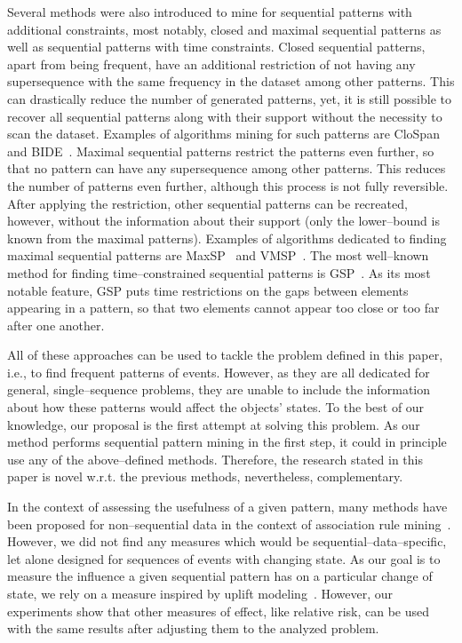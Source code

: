 \documentclass[runningheads,a4paper]{llncs}
\begin{document}
Several methods were also introduced to mine for sequential patterns with additional constraints, most notably, closed and maximal sequential patterns as well as sequential patterns with time constraints.
Closed sequential patterns, apart from being frequent, have an additional restriction of not having any supersequence with the same frequency in the dataset among other patterns.
This can drastically reduce the number of generated patterns, yet, it is still possible to recover all sequential patterns along with their support without the necessity to scan the dataset.
Examples of algorithms mining for such patterns are CloSpan~\cite{Yan:2003} and BIDE~\cite{Wang:2004}.
Maximal sequential patterns restrict the patterns even further, so that no pattern can have any supersequence among other patterns.
This reduces the number of patterns even further, although this process is not fully reversible.
After applying the restriction, other sequential patterns can be recreated, however, without the information about their support (only the lower--bound is known from the maximal patterns).
Examples of algorithms dedicated to finding maximal sequential patterns are MaxSP~\cite{Fournier:2013} and VMSP~\cite{Fournier:2014-2}.
The most well--known method for finding time--constrained sequential patterns is GSP~\cite{Srikant:1996}.
As its most notable feature, GSP puts time restrictions on the gaps between elements appearing in a pattern, so that two elements cannot appear too close or too far after one another.

All of these approaches can be used to tackle the problem defined in this paper, i.e., to find frequent patterns of events.
However, as they are all dedicated for general, single--sequence problems, they are unable to include the information about how these patterns would affect the objects' states.
To the best of our knowledge, our proposal is the first attempt at solving this problem.
As our method performs sequential pattern mining in the first step, it could in principle use any of the above--defined methods.
Therefore, the research stated in this paper is novel w.r.t. the previous methods, nevertheless, complementary.

In the context of assessing the usefulness of a given pattern, many methods have been proposed for non--sequential data in the context of association rule mining~\cite{Lenca:2007,Tan:2002}.
However, we did not find any measures which would be sequential--data--specific, let alone designed for sequences of events with changing state.
As our goal is to measure the influence a given sequential pattern has on a particular change of state, we rely on a measure inspired by uplift modeling~\cite{Radcliffe:1999}.
However, our experiments show that other measures of effect, like relative risk, can be used with the same results after adjusting them to the analyzed problem.
\end{document}
